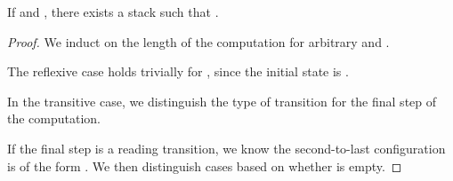 \begin{isabellebody}
\begin{isamarkuptext}
\begin{lemma}\label{MG_steps_imp_stack_word}
If  and 
, there exists a stack  such that 
.
\begin{proof}
We induct on the length of the computation for arbitrary \isa{{\isasymalpha}} and .

The reflexive case holds trivially for , since the initial state is .

In the transitive case, we distinguish the type of transition for the final step of the computation.

If the final step is a reading transition, we know the second-to-last configuration is of the form 
. We then distinguish cases based on whether  is empty. 


\end{proof}
\end{lemma}
\end{isamarkuptext}
\end{isabellebody}
